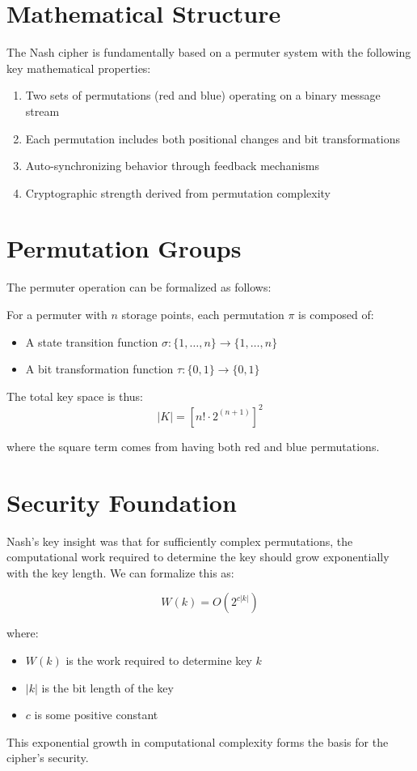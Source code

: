 \section*{Mathematical Structure}

The Nash cipher is fundamentally based on a permuter system with the following key mathematical properties:

\begin{enumerate}
    \item Two sets of permutations (red and blue) operating on a binary message stream
    \item Each permutation includes both positional changes and bit transformations
    \item Auto-synchronizing behavior through feedback mechanisms
    \item Cryptographic strength derived from permutation complexity
\end{enumerate}

\section*{Permutation Groups}

The permuter operation can be formalized as follows:

For a permuter with $n$ storage points, each permutation $\pi$ is composed of:
\begin{itemize}
    \item A state transition function $\sigma : \{1,\ldots,n\} \rightarrow \{1,\ldots,n\}$
    \item A bit transformation function $\tau : \{0,1\} \rightarrow \{0,1\}$
\end{itemize}

The total key space is thus:
\[ |K| = \left[n! \cdot 2^{(n+1)}\right]^2 \]

where the square term comes from having both red and blue permutations.

\section*{Security Foundation}

Nash's key insight was that for sufficiently complex permutations, the computational work required to determine the key should grow exponentially with the key length. We can formalize this as:

\[ W(k) = O(2^{c|k|}) \]

where:
\begin{itemize}
    \item $W(k)$ is the work required to determine key $k$
    \item $|k|$ is the bit length of the key
    \item $c$ is some positive constant
\end{itemize}

This exponential growth in computational complexity forms the basis for the cipher's security.